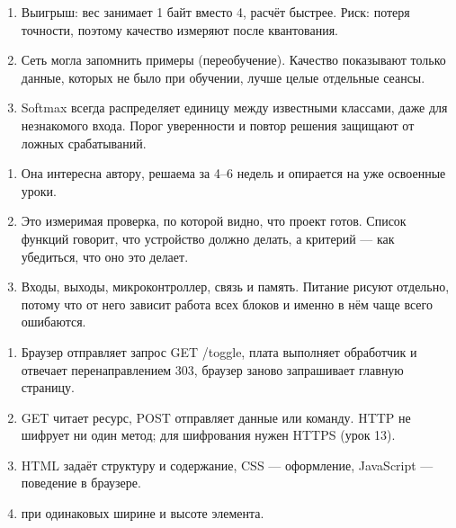 \begin{enumerate}
  \item Выигрыш: вес занимает 1 байт вместо 4, расчёт быстрее. Риск: потеря точности, поэтому качество измеряют после квантования.
  \item Сеть могла запомнить примеры (переобучение). Качество показывают только данные, которых не было при обучении, лучше целые отдельные сеансы.
  \item Softmax всегда распределяет единицу между известными классами, даже для незнакомого входа. Порог уверенности и повтор решения защищают от ложных срабатываний.
\end{enumerate}

\begin{enumerate}
  \item Она интересна автору, решаема за 4--6 недель и опирается на уже освоенные уроки.
  \item Это измеримая проверка, по которой видно, что проект готов. Список функций говорит, что устройство должно делать, а критерий --- как убедиться, что оно это делает.
  \item Входы, выходы, микроконтроллер, связь и память. Питание рисуют отдельно, потому что от него зависит работа всех блоков и именно в нём чаще всего ошибаются.
\end{enumerate}

\begin{enumerate}
  \item Браузер отправляет запрос GET /toggle, плата выполняет обработчик и отвечает перенаправлением 303, браузер заново запрашивает главную страницу.
  \item GET читает ресурс, POST отправляет данные или команду. HTTP не шифрует ни один метод; для шифрования нужен HTTPS (урок 13).
  \item HTML задаёт структуру и содержание, CSS --- оформление, JavaScript --- поведение в браузере.
  \item {} при одинаковых ширине и высоте элемента.
\end{enumerate}

\endgroup
